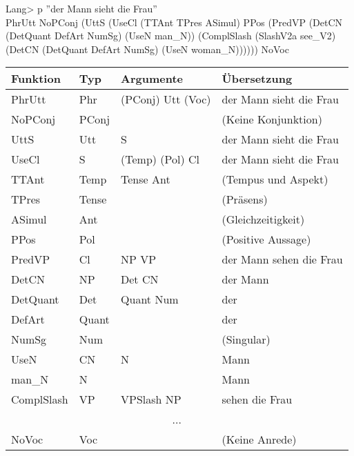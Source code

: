 \documentclass{beamer}
\begin{document}
\begin{frame}

\begin{block}{}
{\scriptsize\ttfamily
Lang> p ''der Mann sieht die Frau'' \\
PhrUtt NoPConj (UttS (UseCl (TTAnt TPres ASimul) PPos (PredVP (DetCN (DetQuant DefArt NumSg) (UseN man\_N)) (ComplSlash (SlashV2a see\_V2) (DetCN (DetQuant DefArt NumSg) (UseN woman\_N)))))) NoVoc
}
\end{block}
{\tiny
\begin{center}
\begin{tabular}{|l|l|l|l|}
\hline
Funktion & Typ & Argumente & Übersetzung\\
\hline
PhrUtt & Phr & (PConj) Utt (Voc) & der Mann sieht die Frau \\
NoPConj & PConj &  & (Keine Konjunktion) \\
UttS & Utt & S & der Mann sieht die Frau \\
UseCl & S & (Temp) (Pol) Cl & der Mann sieht die Frau \\
TTAnt & Temp & Tense Ant & (Tempus und Aspekt) \\
TPres & Tense & & (Präsens) \\
ASimul & Ant & & (Gleichzeitigkeit) \\
PPos & Pol & & (Positive Aussage) \\
PredVP & Cl & NP VP & der Mann sehen die Frau \\
DetCN & NP & Det CN & der Mann \\
DetQuant & Det & Quant Num & der \\
DefArt & Quant & & der \\
NumSg & Num & & (Singular) \\
UseN & CN & N & Mann \\
man\_N & N & & Mann \\
ComplSlash & VP & VPSlash NP & sehen die Frau \\
\multicolumn{4}{|c|}{...} \\
NoVoc & Voc & & (Keine Anrede) \\
\hline
\end{tabular}
\end{center}
}
\end{frame}
\end{document}
